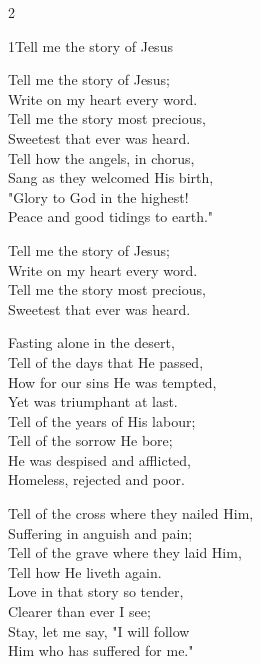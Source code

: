 \clearpage
\begin{multicols}{2}
\setlength{\columnseprule}{0.3pt}
\begin{hymn}{1}{Tell me the story of Jesus}{}
\begin{stanza}
Tell me the story of Jesus;\\
Write on my heart every word.\\
Tell me the story most precious,\\
Sweetest that ever was heard.\\
Tell how the angels, in chorus,\\
Sang as they welcomed His birth,\\
"Glory to God in the highest!\\
Peace and good tidings to earth."
\end{stanza}
\begin{chorus}
Tell me the story of Jesus;\\
Write on my heart every word.\\
Tell me the story most precious,\\
Sweetest that ever was heard.
\end{chorus}
\begin{stanza}
Fasting alone in the desert,\\
Tell of the days that He passed,\\
How for our sins He was tempted,\\
Yet was triumphant at last.\\
Tell of the years of His labour;\\
Tell of the sorrow He bore;\\
He was despised and afflicted,\\
Homeless, rejected and poor.
\end{stanza}
\begin{stanza}
Tell of the cross where they nailed Him,\\
Suffering in anguish and pain;\\
Tell of the grave where they laid Him,\\
Tell how He liveth again.\\
Love in that story so tender,\\
Clearer than ever I see;\\
Stay, let me say, "I will follow\\
Him who has suffered for me."
\end{stanza}
\end{hymn}


\end{multicols}
